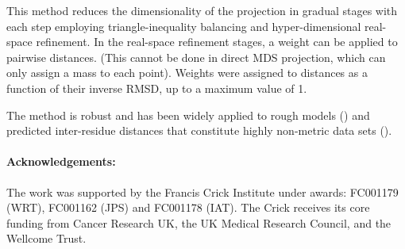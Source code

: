 \documentclass[preprint,12pt]{elsarticle}
\begin{document}
This method reduces the dimensionality of the projection in gradual stages
with each step employing triangle-inequality balancing and hyper-dimensional real-space refinement.
In the real-space refinement stages, a weight can be applied to pairwise distances. (This cannot be
done in direct MDS projection, which can only assign a mass to each point).
Weights were assigned to distances as a function of their inverse RMSD, up to a maximum value of 1.

The method is robust and
has been widely applied to rough models (\cite{TaylorWRet09a}) and predicted inter-residue distances that
constitute highly non-metric data sets (\cite{AszodiAet94a}).
















\paragraph{Acknowledgements:}
The work was supported by the Francis Crick Institute under awards: FC001179 (WRT), FC001162 (JPS) and FC001178 (IAT).
The Crick receives its core funding from Cancer Research UK, the UK Medical Research Council, and the Wellcome Trust.
\end{document}
